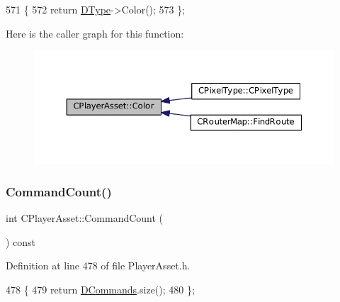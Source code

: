 \begin{DoxyCode}
571                                   \{
572             \textcolor{keywordflow}{return} \hyperlink{classCPlayerAsset_a5d61f73471e1e6f0a6ab15f2ffa7b359}{DType}->Color();  
573         \};
\end{DoxyCode}
Here is the caller graph for this function\+:\nopagebreak
\begin{figure}[H]
\begin{center}
\leavevmode
\includegraphics[width=350pt]{classCPlayerAsset_a969e6e60c6343186d2b9a6cddd6654f8_icgraph}
\end{center}
\end{figure}
\hypertarget{classCPlayerAsset_a5349f1cee794bd34f2255aa6b3177344}{}\label{classCPlayerAsset_a5349f1cee794bd34f2255aa6b3177344} 
\subsubsection{\texorpdfstring{Command\+Count()}{CommandCount()}}
{\footnotesize\ttfamily int C\+Player\+Asset\+::\+Command\+Count (\begin{DoxyParamCaption}{ }\end{DoxyParamCaption}) const\hspace{0.3cm}{\ttfamily [inline]}}



Definition at line 478 of file Player\+Asset.\+h.


\begin{DoxyCode}
478                                 \{
479             \textcolor{keywordflow}{return} \hyperlink{classCPlayerAsset_a4d3b96106d3b1c1020f98005884d2a87}{DCommands}.size();  
480         \};
\end{DoxyCode}
\hypertarget{classCPlayerAsset_ab1667cc26c3439f868708af9d0fc1bda}{}\label{classCPlayerAsset_ab1667cc26c3439f868708af9d0fc1bda} 
